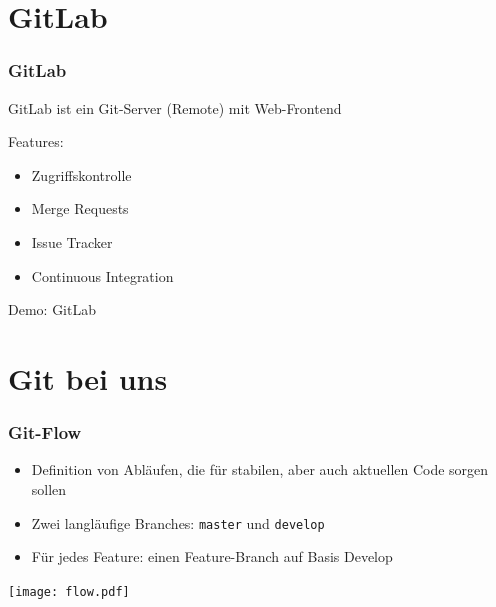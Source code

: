 \documentclass[aspectratio=169]{beamer}
\begin{document}
\section{GitLab}
\begin{frame}
    \frametitle{GitLab}
    GitLab ist ein Git-Server (\glqq{}Remote\grqq{}) mit Web-Frontend
    \pause
    
    \vspace{1cm}

    Features: \pause
    \begin{itemize}
        \item Zugriffskontrolle
            \pause
        \item Merge Requests
            \pause
        \item Issue Tracker
            \pause
        \item Continuous Integration 
    \end{itemize}
\end{frame}

\begin{frame}
    \Huge{Demo: GitLab}
\end{frame}

\section{Git bei uns}
\begin{frame}
    \frametitle{Git-Flow}
    \begin{itemize}
        \item Definition von Abläufen, die für stabilen, aber auch aktuellen Code sorgen sollen
            \pause
        \item Zwei langläufige Branches: \lstinline{master} und \lstinline{develop}
            \pause
        \item Für jedes Feature: einen Feature-Branch auf Basis Develop
            \pause
    \end{itemize}
    \texttt{[image: flow.pdf]}
\end{frame}
\end{document}

